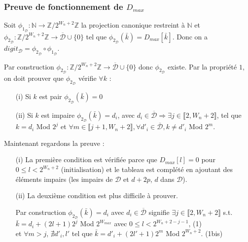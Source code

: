 \documentclass[12pt, a4paper]{memoir}
\begin{document}
\subsubsection{Preuve de fonctionnement de \emph{$D_{max}$}}

\begin{Proposition}
 Soit $\phi_{1_\mathcal{D}} : \mathbb{N} \rightarrow \mathbb{Z} / 2^{W_n+2} \mathbb{Z}$ la projection canonique restreint à $\mathbb{N}$
 et $\phi_{2_\mathcal{D}} : \mathbb{Z} / 2^{W_n+2} \mathbb{Z} \rightarrow \overline{\mathcal{D}} \cup \{0\}$ tel que $\phi_{2_\mathcal{D}}(\bar{k}) = D_{max}[\bar{k}]$.
 Donc on a $digit_{\mathcal{D}} = \phi_{2_\mathcal{D}} \circ \phi_{1_\mathcal{D}}$.
\end{Proposition}

\begin{Preuve}
 Par construction $\phi_{2_\mathcal{D}} : \mathbb{Z} / 2^{W_n+2} \mathbb{Z} \rightarrow \overline{\mathcal{D}} \cup \{0\}$ donc $\phi_{2_\mathcal{D}}$ existe.
 Par la propriété $1$, on doit prouver que $\phi_{2_\mathcal{D}}$ vérifie $\forall k$ : \\
 \begin{itemize}
  \item [(i)] Si $k$ est pair $\phi_{2_\mathcal{D}}(\bar{k}) = 0$
  \item [(ii)] Si $k$ est impaire $\phi_{2_\mathcal{D}}(\bar{k}) = d_i$, avec $d_i \in \overline{\mathcal{D}} 
  \Rightarrow \exists j \in \llbracket 2,W_n+2 \rrbracket$,
 tel que $k = d_i$ Mod $2^j$ et $\forall m \in \llbracket j+1,W_n+2 \rrbracket, \forall d'_i \in \overline{\mathcal{D}}, k \neq d'_i$ Mod $2^m$.
 \end{itemize}
 
 Maintenant regardons la preuve :
 \begin{itemize}
  \item [(i)] La première condition est vérifiée parce que $D_{max}[l] = 0$ pour $0 \leq l < 2^{W_n+2}$ (initialisation) et le tableau est complété en ajoutant des éléments impairs (les impairs de $\mathcal{D}$ et $d+2p$, $d$ dans $\mathcal{D}$).
  \item [(ii)] La deuxième condition est plus difficile à prouver.
  
  Par construction $\phi_{2_\mathcal{D}}(\bar{k}) = d_i$ avec $d_i \in \overline{\mathcal{D}}$ signifie
  $\exists j \in \llbracket 2,W_n+2 \rrbracket$ s.t. $\bar{k} = d_i + (2l+1)2^j$ Mod $2^{W_{max}}$ avec $0 \leq l < 2^{W_n+2-j-1}$, (1) \\
  et $\forall m > j$, $\nexists d'_i, l'$ tel que $\bar{k} = d'_i + (2l'+1)2^m$ Mod $2^{W_n+2}$. (1bis) \\
 \end{itemize}
  \vspace{0.3cm}
  

\end{Preuve}
\end{document}
